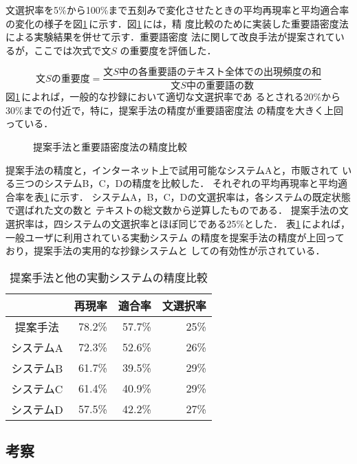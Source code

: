 文選択率を5\%から100\%まで五刻みで変化させたときの平均再現率と平均適合率
の変化の様子を図\ref{fig:rec_pre}\,に示す．図\ref{fig:rec_pre}\,には，精
度比較のために実装した重要語密度法による実験結果を併せて示す．重要語密度
法に関して改良手法が提案されている\cite{Suzuki88}が，ここでは次式で文$S$
の重要度を評価した．

\[ 文Sの重要度 = \frac{文S中の各重要語のテキスト全体での出現頻度の和}
{文S中の重要語の数} \]
図\ref{fig:rec_pre}\,によれば，一般的な抄録において適切な文選択率であ
るとされる20\%から30\%までの付近で，特に，提案手法の精度が重要語密度法
の精度を大きく上回っている．
\begin{figure}[htbp]
\begin{center}

\end{center}
\caption{提案手法と重要語密度法の精度比較}
\label{fig:rec_pre}
\end{figure}

提案手法の精度と，インターネット上で試用可能なシステムAと，市販されて
いる三つのシステムB，C，Dの精度を比較した．
それぞれの平均再現率と平均適合率を表\ref{tab:comparison}\,に示す．
システムA，B，C，Dの文選択率は，各システムの既定状態で選ばれた文の数と
テキストの総文数から逆算したものである．
提案手法の文選択率は，四システムの文選択率とほぼ同じである25\%とした．
表\ref{tab:comparison}\,によれば，一般ユーザに利用されている実動システム
の精度を提案手法の精度が上回っており，提案手法の実用的な抄録システムと
しての有効性が示されている．

\begin{table}[htbp]
\caption{提案手法と他の実動システムの精度比較}
\label{tab:comparison}
\begin{center}
\begin{tabular}{|c||r|r|r|} \hline
 & \multicolumn{1}{c}{再現率} &
\multicolumn{1}{|c|}{適合率} & 
\multicolumn{1}{|c|}{文選択率} \\\hline\hline
提案手法    & 78.2\% & 57.7\% & 25\% \\%
システムA & 72.3\% & 52.6\% & 26\% \\%
システムB & 61.7\% & 39.5\% & 29\% \\%
システムC & 61.4\% & 40.9\% & 29\% \\%
システムD & 57.5\% & 42.2\% & 27\% \\\hline
\end{tabular}
\end{center}
\end{table}

\subsection{考察}
\label{sec:experiment:discussion}

